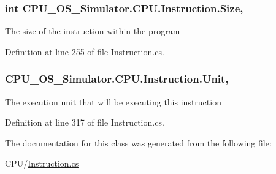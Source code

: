 \hypertarget{class_c_p_u___o_s___simulator_1_1_c_p_u_1_1_instruction_a7c60418808e7bd6cb1964a227dcd9dac}{}
\subsubsection[{Size}]{\setlength{\rightskip}{0pt plus 5cm}int C\+P\+U\+\_\+\+O\+S\+\_\+\+Simulator.\+C\+P\+U.\+Instruction.\+Size\hspace{0.3cm}{\ttfamily [get]}, {\ttfamily [set]}}\label{class_c_p_u___o_s___simulator_1_1_c_p_u_1_1_instruction_a7c60418808e7bd6cb1964a227dcd9dac}


The size of the instruction within the program 



Definition at line 255 of file Instruction.\+cs.

\hypertarget{class_c_p_u___o_s___simulator_1_1_c_p_u_1_1_instruction_a75e93b5a62558ece7da698068625bd8f}{}
\subsubsection[{Unit}]{ C\+P\+U\+\_\+\+O\+S\+\_\+\+Simulator.\+C\+P\+U.\+Instruction.\+Unit\hspace{0.3cm}{\ttfamily [get]}, {\ttfamily [set]}}\label{class_c_p_u___o_s___simulator_1_1_c_p_u_1_1_instruction_a75e93b5a62558ece7da698068625bd8f}


The execution unit that will be executing this instruction 



Definition at line 317 of file Instruction.\+cs.



The documentation for this class was generated from the following file\+:\begin{DoxyCompactItemize}
\item 
C\+P\+U/\hyperlink{_instruction_8cs}{Instruction.\+cs}\end{DoxyCompactItemize}
